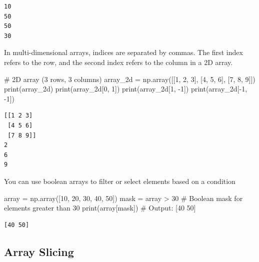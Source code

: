 \documentclass[
  letterpaper,
  DIV=11,
  numbers=noendperiod]{scrreprt}
\newenvironment{Shaded}{\begin{snugshade}}{\end{snugshade}}
\newcommand{\BuiltInTok}[1]{\textcolor[rgb]{0.00,0.23,0.31}{#1}}
\newcommand{\CommentTok}[1]{\textcolor[rgb]{0.37,0.37,0.37}{#1}}
\newcommand{\DecValTok}[1]{\textcolor[rgb]{0.68,0.00,0.00}{#1}}
\newcommand{\NormalTok}[1]{\textcolor[rgb]{0.00,0.23,0.31}{#1}}
\newcommand{\OperatorTok}[1]{\textcolor[rgb]{0.37,0.37,0.37}{#1}}
\begin{document}
\begin{verbatim}
10
50
50
30
\end{verbatim}

In multi-dimensional arrays, indices are separated by commas. The first
index refers to the row, and the second index refers to the column in a
2D array.

\begin{Shaded}
\begin{Highlighting}[]
\CommentTok{\# 2D array (3 rows, 3 columns)}
\NormalTok{array\_2d }\OperatorTok{=}\NormalTok{ np.array([[}\DecValTok{1}\NormalTok{, }\DecValTok{2}\NormalTok{, }\DecValTok{3}\NormalTok{], [}\DecValTok{4}\NormalTok{, }\DecValTok{5}\NormalTok{, }\DecValTok{6}\NormalTok{], [}\DecValTok{7}\NormalTok{, }\DecValTok{8}\NormalTok{, }\DecValTok{9}\NormalTok{]])}
\BuiltInTok{print}\NormalTok{(array\_2d)}
\BuiltInTok{print}\NormalTok{(array\_2d[}\DecValTok{0}\NormalTok{, }\DecValTok{1}\NormalTok{])  }
\BuiltInTok{print}\NormalTok{(array\_2d[}\DecValTok{1}\NormalTok{, }\OperatorTok{{-}}\DecValTok{1}\NormalTok{]) }
\BuiltInTok{print}\NormalTok{(array\_2d[}\OperatorTok{{-}}\DecValTok{1}\NormalTok{, }\OperatorTok{{-}}\DecValTok{1}\NormalTok{])  }
\end{Highlighting}
\end{Shaded}

\begin{verbatim}
[[1 2 3]
 [4 5 6]
 [7 8 9]]
2
6
9
\end{verbatim}

You can use boolean arrays to filter or select elements based on a
condition

\begin{Shaded}
\begin{Highlighting}[]
\NormalTok{array }\OperatorTok{=}\NormalTok{ np.array([}\DecValTok{10}\NormalTok{, }\DecValTok{20}\NormalTok{, }\DecValTok{30}\NormalTok{, }\DecValTok{40}\NormalTok{, }\DecValTok{50}\NormalTok{])}
\NormalTok{mask }\OperatorTok{=}\NormalTok{ array }\OperatorTok{\textgreater{}} \DecValTok{30}  \CommentTok{\# Boolean mask for elements greater than 30}
\BuiltInTok{print}\NormalTok{(array[mask])  }\CommentTok{\# Output: [40 50]}
\end{Highlighting}
\end{Shaded}

\begin{verbatim}
[40 50]
\end{verbatim}

\hypertarget{array-slicing}{%
\subsection{Array Slicing}\label{array-slicing}}
\end{document}
